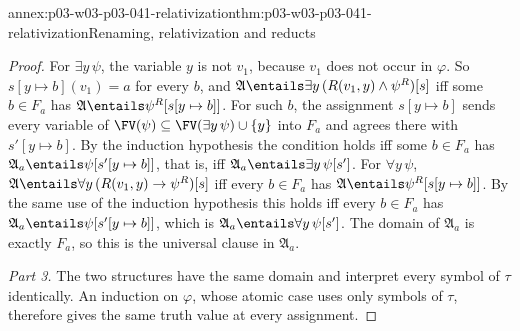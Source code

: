 \begin{annexitem}{annex:p03-w03-p03-041-relativization}{thm:p03-w03-p03-041-relativization}{Renaming, relativization and reducts}
\begin{proof}
For \(\exists y\,\psi\), the variable \(y\) is not \(v_1\), because
\(v_1\) does not occur in \(\varphi\). So \(s[y\mapsto b](v_1)=a\) for
every \(b\), and
\(\mathfrak A\entails\exists y\,(R(v_1,y)\land\psi^{R})[s]\) iff some
\(b\in F_a\) has \(\mathfrak A\entails\psi^{R}[s[y\mapsto b]]\). For such
\(b\), the assignment \(s[y\mapsto b]\) sends every variable of
\(\FV(\psi)\subseteq\FV(\exists y\,\psi)\cup\{y\}\) into \(F_a\) and
agrees there with \(s'[y\mapsto b]\). By the induction hypothesis the
condition holds iff some \(b\in F_a\) has
\(\mathfrak A_a\entails\psi[s'[y\mapsto b]]\), that is, iff
\(\mathfrak A_a\entails\exists y\,\psi[s']\). For \(\forall y\,\psi\),
\(\mathfrak A\entails\forall y\,(R(v_1,y)\to\psi^{R})[s]\) iff every
\(b\in F_a\) has \(\mathfrak A\entails\psi^{R}[s[y\mapsto b]]\). By the
same use of the induction hypothesis this holds iff every \(b\in F_a\) has
\(\mathfrak A_a\entails\psi[s'[y\mapsto b]]\), which is
\(\mathfrak A_a\entails\forall y\,\psi[s']\). The domain of
\(\mathfrak A_a\) is exactly \(F_a\), so this is the universal clause in
\(\mathfrak A_a\).

\emph{Part 3.} The two structures have the same domain and interpret every
symbol of \(\tau\) identically. An induction on \(\varphi\), whose atomic
case uses only symbols of \(\tau\), therefore gives the same truth value at
every assignment.
\end{proof}
\end{annexitem}

